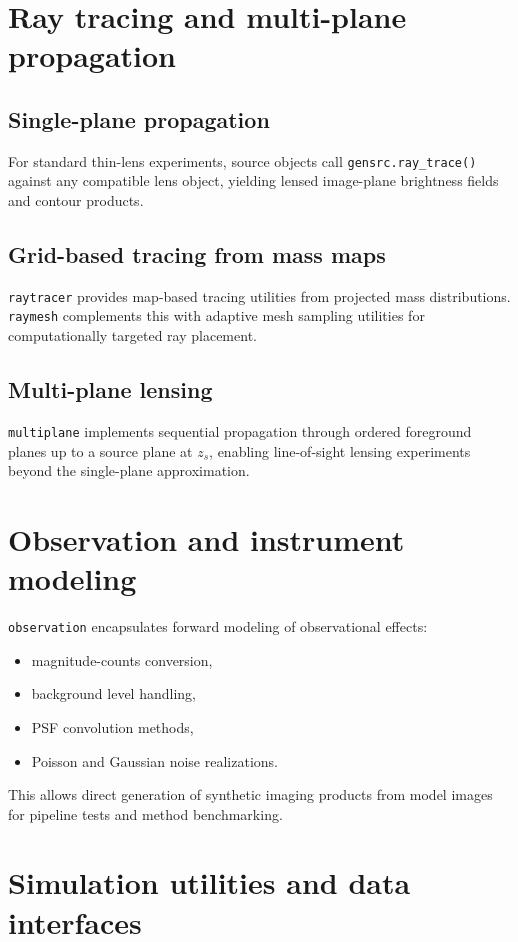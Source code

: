 \documentclass{aa}
\begin{document}
\section{Ray tracing and multi-plane propagation}
\subsection{Single-plane propagation}
For standard thin-lens experiments, source objects call \texttt{gensrc.ray\_trace()} against any compatible lens object, yielding lensed image-plane brightness fields and contour products.

\subsection{Grid-based tracing from mass maps}
\texttt{raytracer} provides map-based tracing utilities from projected mass distributions. \texttt{raymesh} complements this with adaptive mesh sampling utilities for computationally targeted ray placement.

\subsection{Multi-plane lensing}
\texttt{multiplane} implements sequential propagation through ordered foreground planes up to a source plane at $z_s$, enabling line-of-sight lensing experiments beyond the single-plane approximation.

\section{Observation and instrument modeling}
\texttt{observation} encapsulates forward modeling of observational effects:
\begin{itemize}
\item magnitude-counts conversion,
\item background level handling,
\item PSF convolution methods,
\item Poisson and Gaussian noise realizations.
\end{itemize}
This allows direct generation of synthetic imaging products from model images for pipeline tests and method benchmarking.

\section{Simulation utilities and data interfaces}
\end{document}
